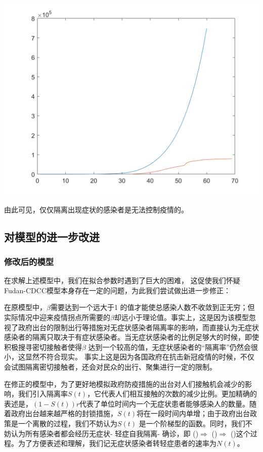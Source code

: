 \documentclass[UTF8]{ctexart}
\begin{document}
					\centerline{\includegraphics[scale=0.3]{2.png}}
					
				
				
				由此可见，仅仅隔离出现症状的感染者是无法控制疫情的。
	
		\subsection{对模型的进一步改进}
			\subsubsection{修改后的模型}
				在求解上述模型中，我们在拟合参数时遇到了巨大的困难，
				这促使我们怀疑Fudan-CDCC模型本身存在一定的问题，为此我们尝试做出进一步修正：
				
				\indent 在原模型中，$\beta$需要达到一个远大于1 的值才能使总感染人数不收敛到正无穷；但实际情况中迎来疫情拐点所需要的$\beta$却远小于理论值。事实上，这是因为该模型忽视了政府出台的限制出行等措施对无症状感染者隔离率的影响，而直接认为无症状感染者的隔离只取决于有症状感染者。当无症状感染者的比例足够大的时候，即使积极搜寻密切接触者使得$\beta$ 达到一个较高的值，无症状感染者的“隔离率”仍然会很小，这显然不符合现实。
				事实上这是因为各国政府在抗击新冠疫情的时候，不仅会试图隔离密切接触者，还会对民众的出行、聚集进行一定的限制。
				
				\indent 在修正的模型中，为了更好地模拟政府防疫措施的出台对人们接触机会减少的影响，我们引入隔离率$S(t)$，它代表人们相互接触的次数的减少比例。更加精确的表述是，$(1-S(t))r$代表了单位时间内一个无症状患者能够感染人的数量。随着政府出台越来越严格的封锁措施，$S(t)$将在一段时间内单增；由于政府出台政策是一个离散的过程，我们不妨认为$S(t)$ 是一个阶梯型的函数。同时，我们不妨认为所有感染者都会经历无症状- 轻症自我隔离- 确诊，即
				(\uppercase\expandafter{})$\Rightarrow$
				(\uppercase\expandafter{})$\Rightarrow$
				(\uppercase\expandafter{})这个过程。为了方便表述和理解，我们记无症状感染者转轻症患者的速率为$N(t)$。
				
\end{document}
